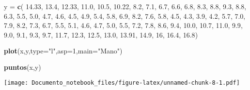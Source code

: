 \documentclass[]{article}
\newenvironment{Shaded}{\begin{snugshade}}{\end{snugshade}}
\newcommand{\KeywordTok}[1]{\textcolor[rgb]{0.13,0.29,0.53}{\textbf{#1}}}
\newcommand{\DataTypeTok}[1]{\textcolor[rgb]{0.13,0.29,0.53}{#1}}
\newcommand{\DecValTok}[1]{\textcolor[rgb]{0.00,0.00,0.81}{#1}}
\newcommand{\FloatTok}[1]{\textcolor[rgb]{0.00,0.00,0.81}{#1}}
\newcommand{\StringTok}[1]{\textcolor[rgb]{0.31,0.60,0.02}{#1}}
\newcommand{\NormalTok}[1]{#1}
\begin{document}
\begin{Shaded}
\begin{Highlighting}[]
\NormalTok{y =}\StringTok{ }\KeywordTok{c}\NormalTok{( }\FloatTok{14.33}\NormalTok{, }\FloatTok{13.4}\NormalTok{, }\FloatTok{12.33}\NormalTok{, }\FloatTok{11.0}\NormalTok{, }\FloatTok{10.5}\NormalTok{, }\FloatTok{10.22}\NormalTok{, }\FloatTok{8.2}\NormalTok{, }\FloatTok{7.1}\NormalTok{, }\FloatTok{6.7}\NormalTok{, }\FloatTok{6.6}\NormalTok{, }
  \FloatTok{6.8}\NormalTok{, }\FloatTok{8.3}\NormalTok{, }\FloatTok{8.8}\NormalTok{, }\FloatTok{9.3}\NormalTok{, }\FloatTok{8.8}\NormalTok{, }
  \FloatTok{6.3}\NormalTok{, }\FloatTok{5.5}\NormalTok{, }\FloatTok{5.0}\NormalTok{, }\FloatTok{4.7}\NormalTok{, }\FloatTok{4.6}\NormalTok{, }\FloatTok{4.5}\NormalTok{, }\FloatTok{4.9}\NormalTok{, }\FloatTok{5.4}\NormalTok{, }\FloatTok{5.8}\NormalTok{, }\FloatTok{6.9}\NormalTok{, }\FloatTok{8.2}\NormalTok{, }\FloatTok{7.6}\NormalTok{, }
  \FloatTok{5.8}\NormalTok{, }\FloatTok{4.5}\NormalTok{, }\FloatTok{4.3}\NormalTok{, }\FloatTok{3.9}\NormalTok{, }\FloatTok{4.2}\NormalTok{, }\FloatTok{5.7}\NormalTok{, }\FloatTok{7.0}\NormalTok{, }\FloatTok{7.9}\NormalTok{, }\FloatTok{8.2}\NormalTok{, }\FloatTok{7.3}\NormalTok{, }
  \FloatTok{6.7}\NormalTok{, }\FloatTok{5.5}\NormalTok{, }\FloatTok{5.1}\NormalTok{, }\FloatTok{4.6}\NormalTok{, }\FloatTok{4.7}\NormalTok{, }\FloatTok{5.0}\NormalTok{, }\FloatTok{5.5}\NormalTok{, }\FloatTok{7.2}\NormalTok{, }\FloatTok{7.8}\NormalTok{, }\FloatTok{8.6}\NormalTok{, }\FloatTok{9.4}\NormalTok{, }\FloatTok{10.0}\NormalTok{,  }\FloatTok{10.7}\NormalTok{, }\FloatTok{11.0}\NormalTok{, }
  \FloatTok{9.9}\NormalTok{, }\FloatTok{9.0}\NormalTok{, }\FloatTok{9.1}\NormalTok{, }\FloatTok{9.3}\NormalTok{, }\FloatTok{9.7}\NormalTok{, }\FloatTok{11.7}\NormalTok{, }
  \FloatTok{12.3}\NormalTok{, }\FloatTok{12.5}\NormalTok{, }\FloatTok{13.0}\NormalTok{, }\FloatTok{13.91}\NormalTok{, }\FloatTok{14.9}\NormalTok{, }\DecValTok{16}\NormalTok{, }\FloatTok{16.4}\NormalTok{, }\FloatTok{16.8}\NormalTok{)}


\KeywordTok{plot}\NormalTok{(x,y,}\DataTypeTok{type=}\StringTok{"l"}\NormalTok{,}\DataTypeTok{asp=}\DecValTok{1}\NormalTok{,}\DataTypeTok{main=}\StringTok{"Mano"}\NormalTok{)}

\KeywordTok{puntos}\NormalTok{(x,y)}
\end{Highlighting}
\end{Shaded}

\texttt{[image: Documento\_notebook\_files/figure-latex/unnamed-chunk-8-1.pdf]}
\end{document}
